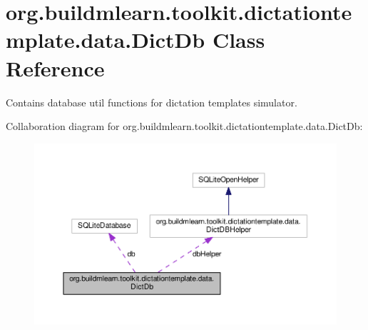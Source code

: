 \hypertarget{classorg_1_1buildmlearn_1_1toolkit_1_1dictationtemplate_1_1data_1_1DictDb}{}\section{org.\+buildmlearn.\+toolkit.\+dictationtemplate.\+data.\+Dict\+Db Class Reference}
\label{classorg_1_1buildmlearn_1_1toolkit_1_1dictationtemplate_1_1data_1_1DictDb}


Contains database util functions for dictation template\textquotesingle{}s simulator.  




Collaboration diagram for org.\+buildmlearn.\+toolkit.\+dictationtemplate.\+data.\+Dict\+Db\+:
\nopagebreak
\begin{figure}[H]
\begin{center}
\leavevmode
\includegraphics[width=350pt]{classorg_1_1buildmlearn_1_1toolkit_1_1dictationtemplate_1_1data_1_1DictDb__coll__graph}
\end{center}
\end{figure}
